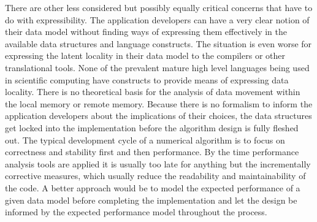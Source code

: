There are other less considered but possibly equally critical concerns
that have to do with expressibility. The application developers can
have a very clear notion of their data model without finding ways of
expressing them effectively in the available data structures and
language constructs. The situation is even worse for expressing the
latent locality in their data model to the compilers or other
translational tools. None of the prevalent mature high level languages
being used in scientific computing have constructs to provide means of
expressing data locality. There is no theoretical basis for the
analysis of data movement within the local memory or remote
memory. Because there is no formalism to inform the application
developers about the implications of their choices, the data
structures get locked into the implementation before the algorithm
design is fully fleshed out.  The typical development cycle of a
numerical algorithm is to focus on correctness and stability first
and then performance. By the time performance analysis tools are
applied it is usually too late for anything but the incrementally
corrective measures, which usually reduce the readability and
maintainability of the code. A better approach would be to model the
expected performance of a given data model before completing the
implementation and let the design be informed by the expected
performance model throughout the process. 



